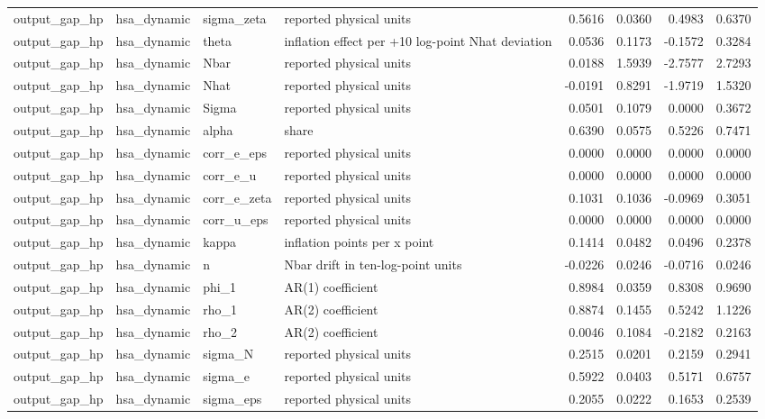 \begin{tabular}{llllrrrr}
output\_gap\_hp & hsa\_dynamic & sigma\_zeta & reported physical units & 0.5616 & 0.0360 & 0.4983 & 0.6370 \\
output\_gap\_hp & hsa\_dynamic & theta & inflation effect per +10 log-point Nhat deviation & 0.0536 & 0.1173 & -0.1572 & 0.3284 \\
output\_gap\_hp & hsa\_dynamic & Nbar & reported physical units & 0.0188 & 1.5939 & -2.7577 & 2.7293 \\
output\_gap\_hp & hsa\_dynamic & Nhat & reported physical units & -0.0191 & 0.8291 & -1.9719 & 1.5320 \\
output\_gap\_hp & hsa\_dynamic & Sigma & reported physical units & 0.0501 & 0.1079 & 0.0000 & 0.3672 \\
output\_gap\_hp & hsa\_dynamic & alpha & share & 0.6390 & 0.0575 & 0.5226 & 0.7471 \\
output\_gap\_hp & hsa\_dynamic & corr\_e\_eps & reported physical units & 0.0000 & 0.0000 & 0.0000 & 0.0000 \\
output\_gap\_hp & hsa\_dynamic & corr\_e\_u & reported physical units & 0.0000 & 0.0000 & 0.0000 & 0.0000 \\
output\_gap\_hp & hsa\_dynamic & corr\_e\_zeta & reported physical units & 0.1031 & 0.1036 & -0.0969 & 0.3051 \\
output\_gap\_hp & hsa\_dynamic & corr\_u\_eps & reported physical units & 0.0000 & 0.0000 & 0.0000 & 0.0000 \\
output\_gap\_hp & hsa\_dynamic & kappa & inflation points per x point & 0.1414 & 0.0482 & 0.0496 & 0.2378 \\
output\_gap\_hp & hsa\_dynamic & n & Nbar drift in ten-log-point units & -0.0226 & 0.0246 & -0.0716 & 0.0246 \\
output\_gap\_hp & hsa\_dynamic & phi\_1 & AR(1) coefficient & 0.8984 & 0.0359 & 0.8308 & 0.9690 \\
output\_gap\_hp & hsa\_dynamic & rho\_1 & AR(2) coefficient & 0.8874 & 0.1455 & 0.5242 & 1.1226 \\
output\_gap\_hp & hsa\_dynamic & rho\_2 & AR(2) coefficient & 0.0046 & 0.1084 & -0.2182 & 0.2163 \\
output\_gap\_hp & hsa\_dynamic & sigma\_N & reported physical units & 0.2515 & 0.0201 & 0.2159 & 0.2941 \\
output\_gap\_hp & hsa\_dynamic & sigma\_e & reported physical units & 0.5922 & 0.0403 & 0.5171 & 0.6757 \\
output\_gap\_hp & hsa\_dynamic & sigma\_eps & reported physical units & 0.2055 & 0.0222 & 0.1653 & 0.2539 \\

\end{tabular}
